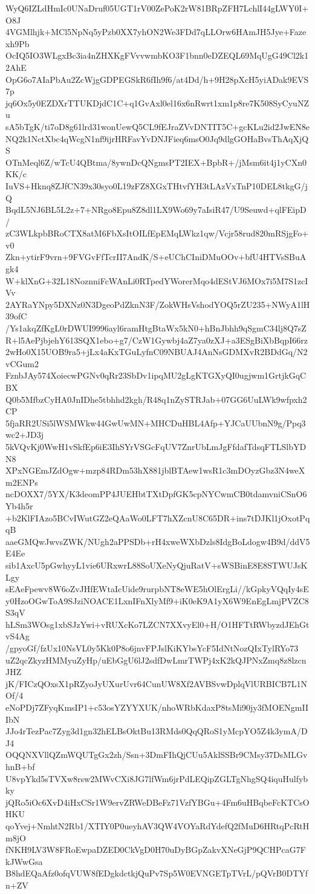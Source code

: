 WyQ6IZLdHmIc0UNaDruf05UGT1rV00ZePoK2rW81BRpZFH7LchlI44gLWY0I+O8J
4VGMlhjk+MCl5NpNq5yPzb0XX7yhON2We3FDd7qLLOrw6HAmJH5Jye+Fazexh9Pb
OcIQ5IO3WLgxBc3ia4nZHXKgFVvvwmbKO3F1bnn0eDZEQL69MqUgG49Cl2k12AhE
OpG6o7AIaPbAu2ZcWjgGDPEGSkR6fIh9f6/at4Dd/h+9H28pXcH5yiADak9EVS7p
jq6Ox5y0EZDXrTTUKDjdC1C+q1GvAxl0el16x6nRwrt1xm1p8re7K508SyCyuNZu
sA5bTgK/ti7oD8g61lrd31wonUewQ5CL9fEJraZVvDNTIT5C+gcKLu2id2JwEN8e
NQ2k1NctXbc4qWcgN1nf9ijrHRFavYvDNJFieq6msO0Jq9dlgGOHaBvsThAqXjQS
OTnMeql6Z/wTcU4QBtma/8ywnDcQNgmsPT2IEX+BpbR+/jMsm6it4j1yCXn0KK/c
IuVS+Hknq8ZJfCN39x30syo0L19zFZ8XGxTHtvfYH3tLAzVxTnP10DEL8tkgG/jQ
BqdL5NJ6BL5L2z+7+NRgo8Epu8Z8dl1LX9Wo69y7aIsiR47/U9Seuwd+qlFEipD/
zC3WLkpbBRoCTX8atM6FbXsItOILfEpEMqLWkz1qw/Vcjr58rud820mRSjgFo+v0
Zkn+ytirF9vrn+9FVGvFfTcrII7AndK/S+eUChCIniDMuOOv+bfU4HTVsSBuAgk4
W+klXnG+32L18NoznniFcWAnLi0RTpedYWorerMqo4dEStVJ6MOx7i5M7S1zcIVv
2AYRaYNpy5DXNz0N3DgeoPdZknN3F/ZokWHsVshodYOQ5rZU235+NWyA1lH39ofC
/Ys1akqZfKgL0rDWUI9996ayl6ramHtgBtaWx5kN0+hBnJbhh9qSgmC34lj8Q7sZ
R+l5AePjbjehY613SQX1ebo+g7/CzW1Gywbj4aZ7ya0zXJ+a3ESgBiXbBqpI66rz
2wHo0X15UOB9ra5+jLx4aKxTGuLyfnC09NBUAJ4AnNsGDMXvR2BDdGq/N2vCGum2
FznbJAy574XoiecwPGNv0qRr23SbDv1ipqMU2gLgKTGXyQI0ugjwm1GrtjkGqCBX
Q0b5MfbzCyHA0JnIDhe5tbhhd2kgh/R48q1nZySTRJab+07GG6UuLWk9wfpxh2CP
5fjaRR2USi5lWSMWkw44GwUwMN+MHCDuHBL4Afp+YJCaUUbnN9g/Ppq3wc2+JD3j
5kVQvKj0WwH1vSkfEp6iE3IhSYrVSGcFqUV7ZnrUbLmJgFfdafTdsqFTLSlbYDN8
XPxNGEmJZdOgw+mzp84RDm53hX881jblBTAew1wsR1c3mDOyzGbz3N4weXm2ENPs
ncDOXX7/5YX/K3deomPP4JUEHbtTXtDpfGK5cpNYCwmCB0tdamvniCSnO6Yb4h5r
+b2KlFIAzo5BCvIWutGZ2eQAaWo0LFT7hXZcnU8C65DR+ins7tDJKl1jOxotPqqB
aaeGMQwJwvsZWK/NUgh2aPPSDb+rH4xweWXbDzls8IdgBoLdogw4B9d/ddV5E4Ee
sib1AxcU5pGwhyyL1vie6URxwrL88SoUXeNyQjuRatV+sWSBinE8E8STWUJsKLgy
sEAeFpewv8W6oZvJHfEWtaIcUide9rurpbNT8eWE5hOlErgLi//kGpkyVQqIy4sE
y0HzoOGwToA9SJziNOACE1LxnIFnXlyMf9+iK0eK9A1yX6W9EnEgLmjPVZC8S3qV
hLSm3WOsg1xbSJzYwi+vRUXcKo7LZCN7XXvyEl0+H/O1HFTtRWbyzdJEhGtvS4Ag
/gpyoGf/fzUx10NsVL0y5Kk0P8o6jnvFPJslKiKYbsYcF5IdNtNozQIxTylRYo73
uZ2qcZkyzHMMyuZyHp/uEbGgU6lJ2sdfDwLmrTWPj4xK2kQJPNxZmq8z8lzcnJHZ
jK/FICzQOxsX1pRZyoJyUXurUvr64CunUW8Xf2AVBSvwDplqVlURBICB7L1NOf/4
eNoPDj7ZFyqKmsIP1+c53osYZYYXUK/nhoWRbKdaxP8tsMi90jy3fMOENgmIIIbN
JJo4rTezPac7Zyg3d1gn32hELBsOktBu13RMds0QqQRoS1yMcpYO5Z4k3ymA/DJ4
OQQNXVllQZmWQUTgGx2zh/Ssn+3DmFIhQjCUu5AklSSBr9CMsy37DsMLGvhnB+bf
U8vpYkd5sTVXw8rsw2MWvCXi8JG7lfWm6jrPdLEQipZGLTgNhgSQ4iquHulfybky
jQRo5iOc6XvD4iHxCSr1W9ervZRWeDBeFz71VzfYBGu+4Fm6uHBqbeFcKTCsOHKU
qoYvej+NmhtN2Rb1/XTIY0P0ueyhAV3QW4VOYaRdYdefQ2fMuD6HRtqPcRtHm8jO
fNKH9LV3W8FRoEwpaDZED0CkVgD0H70uDyBGpZakvXNeGjP9QCHPcaG7FkJWwGsa
B8hdEQaAfz0ofqVUW8fEDgkdctkjQuPv7Sp5W0EVNGETpTVrL/pQVrB0DTYfn+ZV
